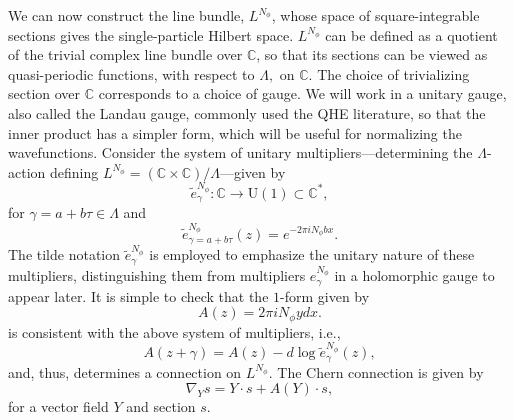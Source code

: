 \documentclass[a4paper,11pt]{article}
\newcommand{\C}{\mathbb{C}}
\begin{document}
We can now construct the line bundle, $L^{N_{\phi}}$, whose space of square-integrable sections gives the single-particle Hilbert space. $L^{N_{\phi}}$ can be defined as a quotient of the trivial complex line bundle over $\C$, so that its sections can be viewed as quasi-periodic functions, with respect to $\Lambda,$ on $\C$.  
The choice of trivializing section over $\C$ corresponds to a choice of gauge.
  We will work in a unitary gauge, also called the Landau gauge, commonly used the QHE literature, so that the inner product has a simpler form, which will be useful for normalizing the wavefunctions. Consider the system of unitary multipliers---determining the $\Lambda$-action defining $L^{N_{\phi}}=\left(\mathbb{C}\times \mathbb{C}\right)/\Lambda$---given by
\begin{equation}
\widetilde{e}^{N_{\phi}}_{\gamma}:\mathbb{C}\rightarrow \mathrm{U}(1)\subset  \mathbb{C}^{*},
\end{equation}
for $\gamma=a+b\tau\in\Lambda$ and
\begin{equation}
   \widetilde{e}^{N_{\phi}}_{\gamma = a+b\tau}(z) = e^{-2\pi i N_{\phi}bx}.
   \label{multipliersunitary}
\end{equation}
The tilde notation $\widetilde{e}^{N_{\phi}}_\gamma$ is employed to emphasize the unitary nature of these multipliers, distinguishing them from multipliers $e^{N_{\phi}}_\gamma$ in a holomorphic gauge to appear later. It is simple to check that the  $1$-form given by $$A(z) = 2\pi iN_{\phi}y dx.$$ is consistent with the above system of multipliers, i.e.,
\begin{equation}
  A(z+\gamma) = A(z) -  d\log \widetilde{e}^{N_{\phi}}_{\gamma}(z),
\end{equation}
and, thus, determines a connection on $L^{N_{\phi}}$. 
The Chern connection is given by
\begin{equation}
    \nabla_{Y}s = Y\cdot s + A(Y)\cdot s,
\end{equation}
for a vector field $Y$ and section $s$. 
\end{document}
